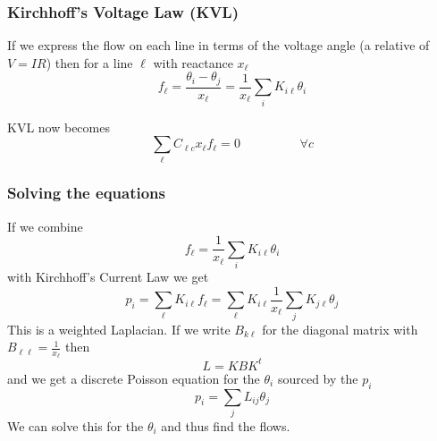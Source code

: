 \documentclass[10pt,aspectratio=169,dvipsnames]{beamer}
\begin{document}
\begin{frame}
  \frametitle{Kirchhoff's Voltage Law (KVL)}

  If we express the flow on each line in terms of the voltage angle (a
  relative of $V = IR$) then for a line $\ell$ with reactance $x_\ell$
  \begin{equation*}
    f_\ell = \frac{\theta_i - \theta_j}{x_\ell} = \frac{1}{x_\ell}\sum_{i} K_{i\ell} \theta_i
  \end{equation*}

  KVL now becomes
  \begin{equation*}
    \sum_\ell C_{\ell c} x_\ell f_\ell = 0 \hspace{2cm} \forall c
  \end{equation*}

\end{frame}



\begin{frame}
  \frametitle{Solving the equations}

  If we combine
    \begin{equation*}
    f_\ell  = \frac{1}{x_\ell}\sum_{i} K_{i\ell} \theta_i
  \end{equation*}
    with Kirchhoff's Current Law we get
    \begin{equation*}
    p_i = \sum_{\ell} K_{i\ell}f_\ell =   \sum_{\ell} K_{i\ell} \frac{1}{x_\ell}\sum_{j} K_{j\ell} \theta_j
    \end{equation*}
    This is a \alert{weighted Laplacian}. If we write $B_{k\ell}$ for the diagonal matrix with $B_{\ell\ell} = \frac{1}{x_\ell}$ then
    \begin{equation*}
      L = KBK^t
    \end{equation*}
    and we get a \alert{discrete Poisson equation} for the $\theta_i$ sourced by the $p_i$
    \begin{equation*}
      p_i = \sum_{j} L_{ij} \theta_j
    \end{equation*}
    We can solve this for the $\theta_i$ and thus find the flows.

\end{frame}
\end{document}
